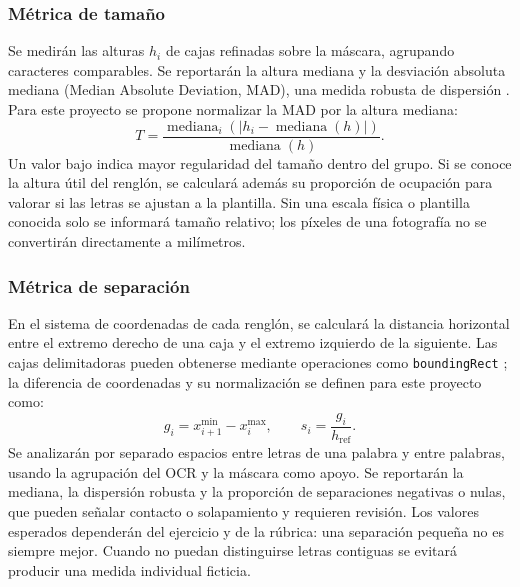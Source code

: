 \subsubsection{Métrica de tamaño}
Se medirán las alturas $h_i$ de cajas refinadas sobre la máscara, agrupando caracteres comparables. Se reportarán la altura mediana y la desviación absoluta mediana (Median Absolute Deviation, MAD), una medida robusta de dispersión \cite{nistScale}. Para este proyecto se propone normalizar la MAD por la altura mediana:
\begin{equation}
 T=\frac{\operatorname{mediana}_i\left(|h_i-\operatorname{mediana}(h)|\right)}
 {\operatorname{mediana}(h)}.
\end{equation}
Un valor bajo indica mayor regularidad del tamaño dentro del grupo. Si se conoce la altura útil del renglón, se calculará además su proporción de ocupación para valorar si las letras se ajustan a la plantilla. Sin una escala física o plantilla conocida solo se informará tamaño relativo; los píxeles de una fotografía no se convertirán directamente a milímetros.

\subsubsection{Métrica de separación}
En el sistema de coordenadas de cada renglón, se calculará la distancia horizontal entre el extremo derecho de una caja y el extremo izquierdo de la siguiente. Las cajas delimitadoras pueden obtenerse mediante operaciones como \texttt{boundingRect} \cite{opencvShape}; la diferencia de coordenadas y su normalización se definen para este proyecto como:
\begin{equation}
 g_i=x^{\min}_{i+1}-x^{\max}_i, \qquad s_i=\frac{g_i}{h_{\mathrm{ref}}}.
\end{equation}
Se analizarán por separado espacios entre letras de una palabra y entre palabras, usando la agrupación del OCR y la máscara como apoyo. Se reportarán la mediana, la dispersión robusta y la proporción de separaciones negativas o nulas, que pueden señalar contacto o solapamiento y requieren revisión. Los valores esperados dependerán del ejercicio y de la rúbrica: una separación pequeña no es siempre mejor. Cuando no puedan distinguirse letras contiguas se evitará producir una medida individual ficticia.

